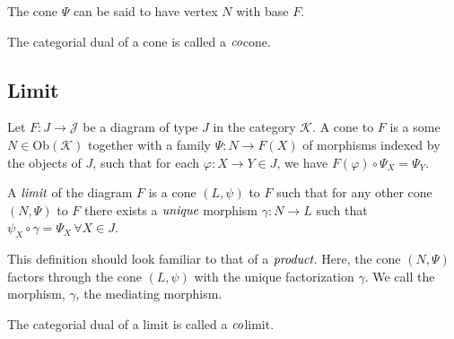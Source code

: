 \documentclass[10pt, oneside, reqno]{amsart}
\begin{document}
\begin{rem}
 The cone $\Psi$ can be said to have vertex $N$ with base $F$.
\end{rem}

\begin{rem}[Cocone]
 The categorial dual of a cone is called a $\emph{co}$cone.
\end{rem}

\subsection{Limit} %
\label{subsec:limit}
Let $F: J \to \mathcal{J}$ be a diagram of type $J$ in the category $\mathcal{K}$.
A cone to $F$ is a some $N \in \text{Ob}(\mathcal{K})$ together with a family
$\Psi: N \to F(X)$ of morphisms indexed by the objects of $J$, such that
for each $\varphi: X \to Y \in J$, we have $F(\varphi) \circ \Psi_{X} = \Psi_{Y}$.

A $\emph{limit}$ of the diagram $F$ is a cone $(L,\psi)$ to $F$ such that for any other
cone $(N,\Psi)$ to $F$ there exists a $\emph{unique}$ morphism $\gamma: N \to L$ such that
$\psi_{X} \circ \gamma = \Psi_{X} \, \forall X \in J$.


This definition should look familiar to that of a $\emph{product}$.
Here, the cone $(N, \Psi)$ factors through the cone $(L, \psi)$ with the unique factorization $\gamma$.
We call the morphism, $\gamma$, the mediating morphism.

\begin{rem}[Colimit]
 The categorial dual of a limit is called a $\emph{co}$limit.
\end{rem}
\end{document}
